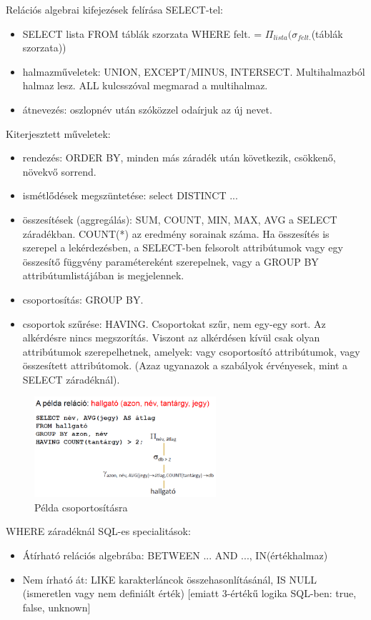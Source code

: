 \documentclass[margin=0px]{article}
\begin{document}
Relációs algebrai kifejezések felírása SELECT-tel:
\begin{itemize}
    \item SELECT lista FROM táblák szorzata WHERE felt. = $\Pi_{lista}(\sigma_{felt.}$(táblák szorzata))
    \item halmazműveletek: UNION, EXCEPT/MINUS, INTERSECT. Multihalmazból halmaz lesz. ALL kulcsszóval megmarad a multihalmaz.
    \item átnevezés: oszlopnév után szóközzel odaírjuk az új nevet.
\end{itemize}
Kiterjesztett műveletek:
\begin{itemize}
    \item rendezés: ORDER BY, minden más záradék után következik, csökkenő, növekvő sorrend.
    \item ismétlődések megszüntetése: select DISTINCT ...
    \item összesítések (aggregálás): SUM, COUNT, MIN, MAX, AVG a SELECT záradékban. COUNT(*) az eredmény sorainak száma. Ha összesítés is szerepel a lekérdezésben, a SELECT-ben felsorolt attribútumok vagy egy összesítő függvény paramétereként szerepelnek, vagy a GROUP BY attribútumlistájában is megjelennek.
    \item csoportosítás: GROUP BY.
    \item csoportok szűrése: HAVING. Csoportokat szűr, nem egy-egy sort. Az alkérdésre nincs megszorítás. Viszont az alkérdésen kívül csak olyan attribútumok szerepelhetnek, amelyek: vagy csoportosító attribútumok, vagy összesített attribútomok. (Azaz ugyanazok a szabályok érvényesek, mint a SELECT záradéknál).
\end{itemize}
\begin{figure}[H]
    \centering
    \includegraphics[width=0.6\textwidth]{img/sql2.png}
    \caption{Példa csoportosításra}
\end{figure}
WHERE záradéknál SQL-es specialitások:
\begin{itemize}
    \item Átírható relációs algebrába: BETWEEN ... AND ..., IN(értékhalmaz)
    \item Nem írható át: LIKE karakterláncok összehasonlításánál, IS NULL (ismeretlen vagy nem definiált érték) [emiatt 3-értékű logika SQL-ben: true, false, unknown]
\end{itemize}
\end{document}
